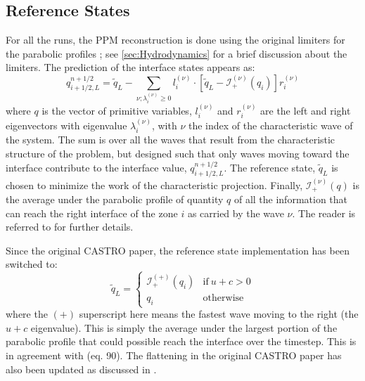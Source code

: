 \documentclass[iop]{../emulateapj}
\begin{document}
\subsection{Reference States}

For all the runs, the PPM reconstruction is done using the original limiters for
the parabolic profiles \citep{ppm}; see \autoref{sec:Hydrodynamics} for a brief 
discussion about the limiters.  The prediction of the interface
states appears as:
\begin{equation}
\label{eq:ppmstatel}
q_{i+1/2,L}^{n+1/2} = \tilde{q}_L -
   \sum_{\nu;\lambda_i^{(\nu)}\ge 0} l_i^{(\nu)} \cdot \left [
        \tilde{q}_L  - \mathcal{I}^{(\nu)}_+(q_i)
       \right ] r_i^{(\nu)}
\end{equation}
where $q$ is the vector of primitive variables, $l_i^{(\nu)}$ and
$r_i^{(\nu)}$ are the left and right eigenvectors with eigenvalue
$\lambda_i^{(\nu)}$, with $\nu$ the index of the characteristic wave of
the system.  The sum is over all the waves that result from the
characteristic structure of the problem, but designed such that only
waves moving toward the interface contribute to the interface value,
$q_{i+1/2,L}^{n+1/2}$.  The reference state, $\tilde{q}_L$ is
chosen to minimize the work of the characteristic projection.
Finally, $\mathcal{I}_+^{(\nu)}(q)$ is the
average under the parabolic profile of quantity $q$ of all the
information that can reach the right interface of the zone $i$ as
carried by the wave $\nu$.  The reader is referred to
\citet{ppmunsplit} for further details.

Since the original CASTRO paper, the reference state implementation
has been switched to:
\begin{equation}
\label{eq:refchoice}
\tilde{q}_L = \left \{ \begin{array}{cc}
       \mathcal{I}_+^{(+)}(q_i) & \mathrm{if~} u + c > 0 \\
       q_i                    & \mathrm{otherwise}
\end{array}
\right .
\end{equation}
where the $(+)$ superscript here means the fastest wave moving to the right
(the $u+c$ eigenvalue).   This is simply the average under the largest
portion of the parabolic profile that could possible reach the interface 
over the timestep.  This is
in agreement with \citet{ppmunsplit} (eq. 90).  The flattening
in the original CASTRO paper has also been updated as discussed
in \citet{zingalekatz:2015}.
\end{document}
